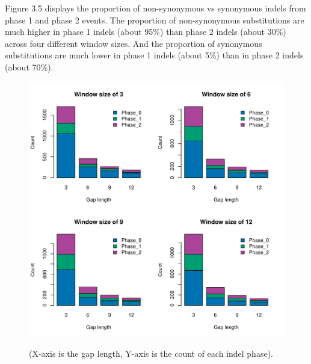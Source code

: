Figure 3.5 displays the proportion of non-synonymous vs synonymous indels from phase 1 and phase 2 events. The proportion of non-synonymous substitutions are much higher in phase 1 indels (about 95\%) than phase 2 indels (about 30\%) across four different window sizes. And the proportion of synonymous substitutions are much lower in phase 1 indels (about 5\%) than in phase 2 indels (about 70\%). 

\begin{figure}[H]
     \centering
     \begin{minipage}[t]{1\textwidth }
     \includegraphics[width=\linewidth, height=\linewidth]{Fig4.pdf}
     { {(X-axis is the gap length, Y-axis is the count of each indel phase).}
 \par}
     \end{minipage}
\end{figure}

